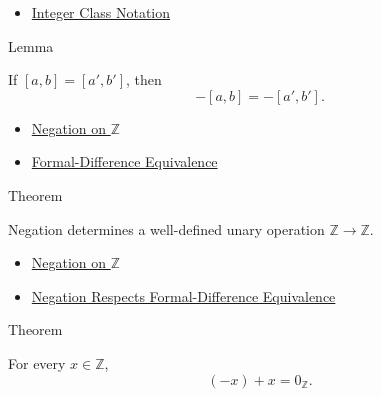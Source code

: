 \begin{dependencies}
\begin{itemize}
  \item \hyperref[def:integer-class-notation]{Integer Class Notation}
\end{itemize}
\end{dependencies}

\begin{lemmabox}{Lemma}
\begin{lemma}
\label{lem:negation-on-z-classes-respects-equivalence}
If $[a,b]=[a',b']$, then
\[
-[a,b]=-[a',b'].
\]
\end{lemma}
\end{lemmabox}

\begin{dependencies}
\begin{itemize}
  \item \hyperref[def:negation-on-z-classes]{Negation on $\mathbb{Z}$}
  \item \hyperref[def:formal-difference-equivalence]{Formal-Difference Equivalence}
\end{itemize}
\end{dependencies}

\begin{theorembox}{Theorem}
\begin{theorem}
\label{thm:negation-on-z-well-defined}
Negation determines a well-defined unary operation $\mathbb{Z}\to\mathbb{Z}$.
\end{theorem}
\end{theorembox}

\begin{dependencies}
\begin{itemize}
  \item \hyperref[def:negation-on-z-classes]{Negation on $\mathbb{Z}$}
  \item \hyperref[lem:negation-on-z-classes-respects-equivalence]{Negation Respects Formal-Difference Equivalence}
\end{itemize}
\end{dependencies}

\begin{theorembox}{Theorem}
\begin{theorem}
\label{thm:negation-left-additive-inverse-on-z}
For every $x\in\mathbb{Z}$,
\[
(-x)+x=0_{\mathbb{Z}}.
\]
\end{theorem}
\end{theorembox}

